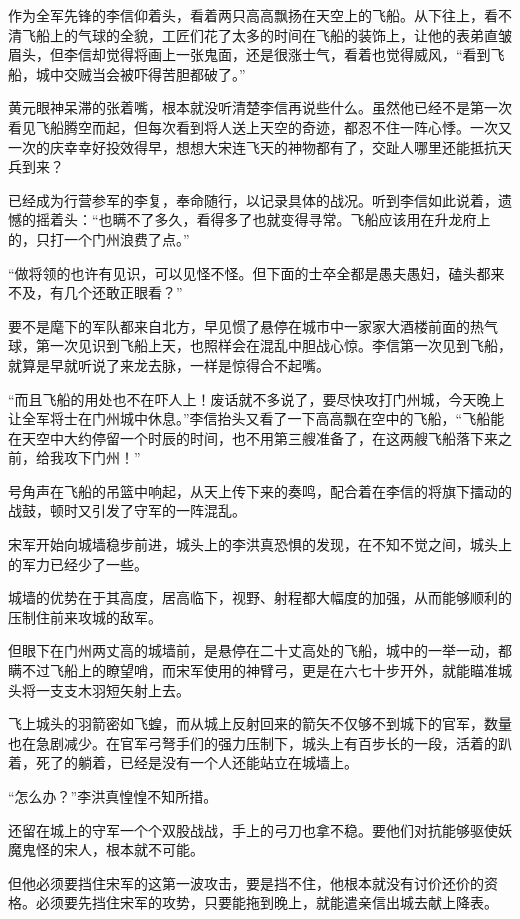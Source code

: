 作为全军先锋的李信仰着头，看着两只高高飘扬在天空上的飞船。从下往上，看不清飞船上的气球的全貌，工匠们花了太多的时间在飞船的装饰上，让他的表弟直皱眉头，但李信却觉得将画上一张鬼面，还是很涨士气，看着也觉得威风，“看到飞船，城中交贼当会被吓得苦胆都破了。”

黄元眼神呆滞的张着嘴，根本就没听清楚李信再说些什么。虽然他已经不是第一次看见飞船腾空而起，但每次看到将人送上天空的奇迹，都忍不住一阵心悸。一次又一次的庆幸幸好投效得早，想想大宋连飞天的神物都有了，交趾人哪里还能抵抗天兵到来？

已经成为行营参军的李复，奉命随行，以记录具体的战况。听到李信如此说着，遗憾的摇着头：“也瞒不了多久，看得多了也就变得寻常。飞船应该用在升龙府上的，只打一个门州浪费了点。”

“做将领的也许有见识，可以见怪不怪。但下面的士卒全都是愚夫愚妇，磕头都来不及，有几个还敢正眼看？”

要不是麾下的军队都来自北方，早见惯了悬停在城市中一家家大酒楼前面的热气球，第一次见识到飞船上天，也照样会在混乱中胆战心惊。李信第一次见到飞船，就算是早就听说了来龙去脉，一样是惊得合不起嘴。

“而且飞船的用处也不在吓人上！废话就不多说了，要尽快攻打门州城，今天晚上让全军将士在门州城中休息。”李信抬头又看了一下高高飘在空中的飞船，“飞船能在天空中大约停留一个时辰的时间，也不用第三艘准备了，在这两艘飞船落下来之前，给我攻下门州！”

号角声在飞船的吊篮中响起，从天上传下来的奏鸣，配合着在李信的将旗下擂动的战鼓，顿时又引发了守军的一阵混乱。

宋军开始向城墙稳步前进，城头上的李洪真恐惧的发现，在不知不觉之间，城头上的军力已经少了一些。

城墙的优势在于其高度，居高临下，视野、射程都大幅度的加强，从而能够顺利的压制住前来攻城的敌军。

但眼下在门州两丈高的城墙前，是悬停在二十丈高处的飞船，城中的一举一动，都瞒不过飞船上的瞭望哨，而宋军使用的神臂弓，更是在六七十步开外，就能瞄准城头将一支支木羽短矢射上去。

飞上城头的羽箭密如飞蝗，而从城上反射回来的箭矢不仅够不到城下的官军，数量也在急剧减少。在官军弓弩手们的强力压制下，城头上有百步长的一段，活着的趴着，死了的躺着，已经是没有一个人还能站立在城墙上。

“怎么办？”李洪真惶惶不知所措。

还留在城上的守军一个个双股战战，手上的弓刀也拿不稳。要他们对抗能够驱使妖魔鬼怪的宋人，根本就不可能。

但他必须要挡住宋军的这第一波攻击，要是挡不住，他根本就没有讨价还价的资格。必须要先挡住宋军的攻势，只要能拖到晚上，就能遣亲信出城去献上降表。

